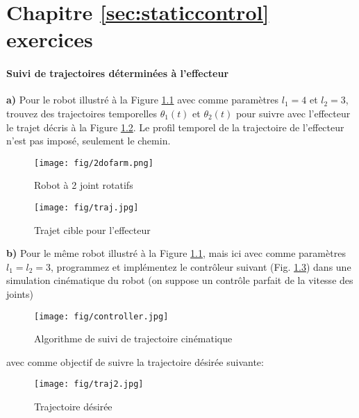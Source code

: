 \chapter{Chapitre \ref{sec:staticcontrol} exercices}
\label{sec:exer_staticcontrol}


\subsubsection{Suivi de trajectoires déterminées à l'effecteur}


\textbf{a)} Pour le robot illustré à la Figure \ref{fig:2dofarm} avec comme paramètres $l_1=4$ et $l_2=3$, trouvez des trajectoires temporelles $\theta_1(t)$ et $\theta_2(t)$ pour suivre avec l'effecteur le trajet décris à la Figure \ref{fig:traj}. Le profil temporel de la trajectoire de l'effecteur n'est pas imposé, seulement le chemin. 
\begin{figure}[htbp]
	\centering
		\texttt{[image: fig/2dofarm.png]}
	\vspace{-5pt}
	\caption{Robot à 2 joint rotatifs}
	\label{fig:2dofarm}
	\vspace{-5pt}
\end{figure}
\begin{figure}[htbp]
	\centering
		\texttt{[image: fig/traj.jpg]}
	\caption{Trajet cible pour l'effecteur}
	\label{fig:traj}
\end{figure}


\textbf{b)} Pour le même robot illustré à la Figure \ref{fig:2dofarm}, mais ici avec comme paramètres $l_1=l_2=3$, programmez et implémentez le contrôleur suivant (Fig. \ref{fig:controller}) dans une simulation cinématique du robot (on suppose un contrôle parfait de la vitesse des joints)
\begin{figure}[H]
	\centering
		\texttt{[image: fig/controller.jpg]}
	\caption{Algorithme de suivi de trajectoire cinématique}
	\label{fig:controller}
\end{figure}
avec comme objectif de suivre la trajectoire désirée suivante:
\begin{figure}[H]
	\centering
		\texttt{[image: fig/traj2.jpg]}
	\caption{Trajectoire désirée}
	\label{fig:traj2}
\end{figure}
